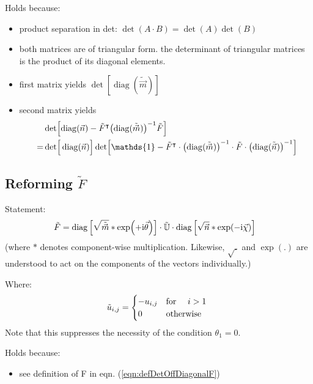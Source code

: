 \documentclass[
	english,
	a4paper,
	fontsize=10pt,
	parskip=half,
	titlepage=true,
	DIV=12,
	final
]{scrreprt}
\newcommand*{\transp}{\ensuremath{^\intercal}}
\newcommand*{\iunit}{\ensuremath{\mathrm{i}}}
\DeclareMathOperator{\diag}{diag}
\begin{document}
Holds because:
\begin{itemize}
\item product separation in det: $\det(A \cdot B) = \det(A) \det(B)$
\item both matrices are of triangular form. the determinant of triangular matrices is the product of
	its diagonal elements.
\item first matrix yields $\det[ \diag(\tilde{\vec{m}}) ]$
\item second matrix yields 
	\begin{align*}
	\quad& \det[ \diag(\vec{n}) - \tilde{F}\transp \qty(\diag(\tilde{\vec{m}}))^{-1}\tilde{F} ] \\
	=    &  \det[\Big. \diag(\vec{n}) ] 
			\det[\Big. 
				\mathds{1} - 
				\tilde{F}\transp \cdot \qty( \diag(\tilde{\vec{m}}) )^{-1}
				\cdot
				\tilde{F} \cdot \qty( \diag(\tilde{\vec{n}}) )^{-1}
			]
	\end{align*}
\end{itemize}

\subsection{Reforming $\tilde{F}$}
Statement:
\begin{align}
	\tilde{F}
&=
	\diag\qty[ \sqrt{ \tilde{\vec{m}}} * \exp(+\iunit \vec{\theta}) ]
	\cdot \tilde{\mathbb{U}} \cdot
	\diag\qty[ \sqrt{        \vec{n} } * \exp(-\iunit \vec{\chi  }) ]
\end{align}
(where $*$ denotes component-wise multiplication. Likewise, $\sqrt{.}$ and $\exp(.)$ are understood to act on the components of the vectors individually.)

Where:
\begin{equation}
	\tilde{u}_{i,j} = \begin{cases}
		-u_{i,j}		&\qq*{for } i > 1 \\
		0			&\qotherwise*
	\end{cases}
\end{equation}
Note that this suppresses the necessity of the condition $\theta_1 = 0$.

Holds because:
\begin{itemize}
\item see definition of F in eqn. (\ref{eqn:defDetOffDiagonalF})
\end{itemize}
\end{document}
